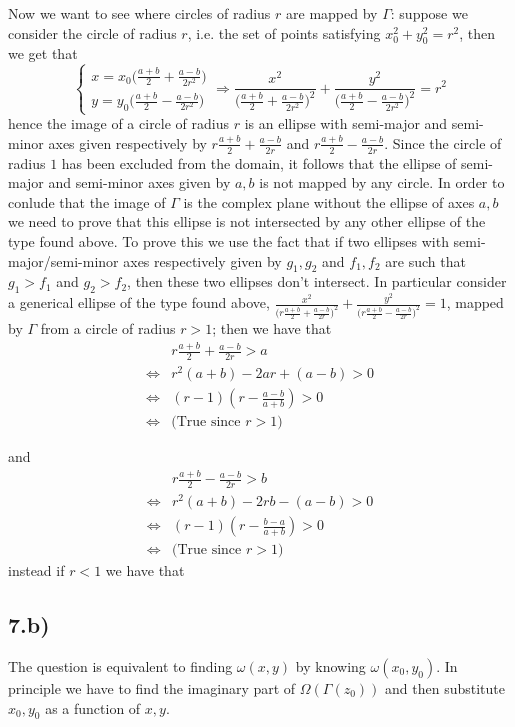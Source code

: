 \documentclass[10pt,a4paper]{book}
\begin{document}
Now we want to see where circles of radius $r$ are mapped by $\Gamma$: suppose we consider the circle of radius $r$, i.e. the set of points satisfying $x_0^2+y_0^2=r^2$, then we get that
$$\begin{cases}
x=x_0\big(\frac{a+b}{2}+\frac{a-b}{2r^2}\big)\\
y=y_0\big(\frac{a+b}{2}-\frac{a-b}{2r^2}\big)
\end{cases}\Rightarrow \frac{x^2}{\big(\frac{a+b}{2}+\frac{a-b}{2r^2}\big)^2}+\frac{y^2}{\big(\frac{a+b}{2}-\frac{a-b}{2r^2}\big)^2}=r^2$$
hence the image of a circle of radius $r$ is an ellipse with semi-major and semi-minor axes given respectively by $r\frac{a+b}{2}+\frac{a-b}{2r}$ and $r\frac{a+b}{2}-\frac{a-b}{2r}$. Since the circle of radius $1$ has been excluded from the domain, it follows that the ellipse of semi-major and semi-minor axes given by $a,b$ is not mapped by any circle. In order to conlude that the image of $\Gamma$ is the complex plane without the ellipse of axes $a,b$ we need to prove that this ellipse is not intersected by any other ellipse of the type found above. To prove this we use the fact that if two ellipses with semi-major/semi-minor axes respectively given by $g_1,g_2$ and $f_1,f_2$ are such that $g_1>f_1$ and $g_2>f_2$, then these two ellipses don't intersect. In particular consider a generical ellipse of the type found above, $\frac{x^2}{\big(r\frac{a+b}{2}+\frac{a-b}{2r}\big)^2}+\frac{y^2}{\big(r\frac{a+b}{2}-\frac{a-b}{2r}\big)^2}=1$, mapped by $\Gamma$ from a circle of radius $r>1$; then we have that 
\begin{align*}
&r\frac{a+b}{2}+\frac{a-b}{2r}>a\\
\Leftrightarrow & r^2(a+b)-2ar+(a-b)>0\\
\Leftrightarrow & (r-1)(r-\frac{a-b}{a+b})>0\\
\Leftrightarrow &\text{(True since }r>1)
\end{align*}

and \begin{align*}
&r\frac{a+b}{2}-\frac{a-b}{2r}>b\\
\Leftrightarrow &r^2(a+b)-2rb-(a-b)>0\\
\Leftrightarrow &(r-1)(r-\frac{b-a}{a+b})>0\\
\Leftrightarrow &\text{(True since }r>1)
\end{align*}
instead if $r<1$ we have that 

\subsection*{7.b)}
The question is equivalent to finding $\omega(x,y)$ by knowing $\omega(x_0,y_0)$. In principle we have to find the imaginary part of $\Omega(\Gamma(z_0))$ and then substitute $x_0,y_0$ as a function of $x,y$. 
\end{document}
